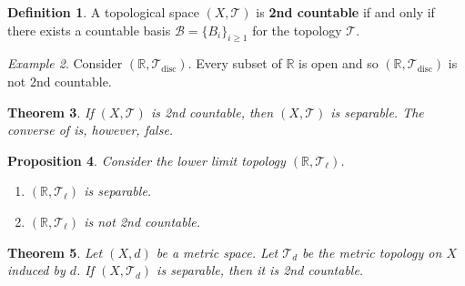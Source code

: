 \documentclass[ 12pt ]{article}
\newcounter{lecture_num}
\theoremstyle{plain}
\theoremstyle{plain}
\newtheorem{theorem}{Theorem}[lecture_num]
\newtheorem{proposition}[theorem]{Proposition}
\theoremstyle{definition}
\newtheorem{definition}[theorem]{Definition}
\theoremstyle{remark}
\newtheorem{example}[theorem]{Example}
\begin{document}
\begin{definition}
	A topological space $(X, \mathcal{T})$ is \textbf{2nd countable} if and only if there exists a countable basis $\mathcal{B} = \{ B_i \}_{i \geq 1}$ for the topology $\mathcal{T}$.
\end{definition}

\begin{example}
	Consider $(\mathbb{R}, \mathcal{T}_\mathrm{disc})$. Every subset of $\mathbb{R}$ is open and so $(\mathbb{R}, \mathcal{T}_\mathrm{disc})$ is not 2nd countable.
\end{example}

\begin{theorem}
	If $(X, \mathcal{T})$ is 2nd countable, then $(X, \mathcal{T})$ is separable. The converse of is, however, false.
\end{theorem}

\begin{proposition}
	Consider the lower limit topology $(\mathbb{R}, \mathcal{T}_\ell)$.
	\begin{enumerate}
		\item $(\mathbb{R}, \mathcal{T}_\ell)$ is separable.
		\item $(\mathbb{R}, \mathcal{T}_\ell)$ is not 2nd countable.
	\end{enumerate}
\end{proposition}

\begin{theorem}
	Let $(X, d)$ be a metric space. Let $\mathcal{T}_d$ be the metric topology on $X$ induced by $d$. If $(X, \mathcal{T}_d)$ is separable, then it is 2nd countable.
\end{theorem}
\end{document}
